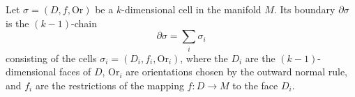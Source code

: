 Let $\sigma = (D, f, \text{Or})$ be a $k$-dimensional cell in the manifold $M$. Its boundary $\partial \sigma$ is the $(k-1)$-chain
$$\partial \sigma = \sum_i \sigma_i$$
consisting of the cells $\sigma_i = (D_i, f_i, \text{Or}_i)$, where the $D_i$ are the $(k-1)$-dimensional faces of $D$, $\text{Or}_i$ are orientations chosen by the outward normal rule, and $f_i$ are the restrictions of the mapping $f: D \to M$ to the face $D_i$.

